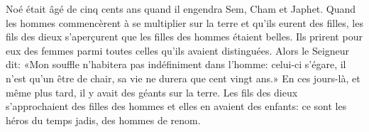 Noé était âgé de cinq cents ans quand il engendra Sem, Cham et Japhet.
Quand les hommes commencèrent à se multiplier sur la terre
	et qu’ils eurent des filles,
	les fils des dieux s’aperçurent que les filles des hommes étaient belles.
	Ils prirent pour eux des femmes
	parmi toutes celles qu’ils avaient distinguées.
Alors le Seigneur dit:
	«Mon souffle n’habitera pas indéfiniment dans l’homme:
	celui-ci s’égare, il n’est qu’un être de chair,
	sa vie ne durera que cent vingt ans.»
En ces jours-là, et même plus tard, il y avait des géants sur la terre.
Les fils des dieux s’approchaient des filles des hommes
	et elles en avaient des enfants:
	ce sont les héros du temps jadis, des hommes de renom.
